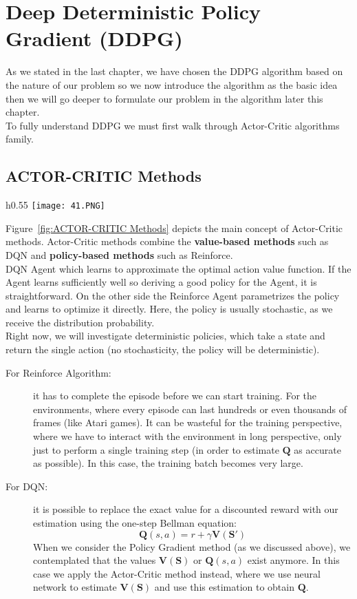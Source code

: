 \chapter{Deep Deterministic Policy Gradient (DDPG)}
As we stated in the last chapter, we have chosen the DDPG algorithm based on the nature of our problem so we now introduce the algorithm as the basic idea then we will go deeper to formulate our problem in the algorithm later this chapter.\\
To fully understand DDPG we must first walk through Actor-Critic algorithms family.

\section{ACTOR-CRITIC Methods}
\begin{wrapfigure}{h}{0.55\textwidth}
    \centering
    \texttt{[image: 41.PNG]}
    \caption{ACTOR-CRITIC Methods}
    \label{fig:ACTOR-CRITIC Methods}
\end{wrapfigure}

Figure~\ref{fig:ACTOR-CRITIC Methods} depicts the main concept of Actor-Critic methods. Actor-Critic methods combine the \textbf{value-based methods} such as DQN and \textbf{policy-based methods} such as Reinforce.\\
DQN Agent which learns to approximate the optimal action value function. If the Agent learns sufficiently well so deriving a good policy for the Agent, it is straightforward.
On the other side the Reinforce Agent parametrizes the policy and learns to optimize it directly. Here, the policy is usually stochastic, as we receive the distribution probability.\\
Right now, we will investigate deterministic policies, which take a state and return the single action (no stochasticity, the policy will be deterministic).\\
\begin{description}
    \item[For Reinforce Algorithm:] it has to complete the episode before we can start training. For the environments, where every episode can last hundreds or even thousands of frames (like Atari games). It can be wasteful for the training perspective, where we have to interact with the environment in long perspective, only just to perform a single training step (in order to estimate $\mathbf{Q}$ as accurate as possible). In this case, the training batch becomes very large.
    \item[For DQN:] it is possible to replace the exact value for a discounted reward with our estimation using the one-step Bellman equation:
    \[ \mathbf{Q}(s,a) = r + \gamma \mathbf{V}( \mathbf{S}' ) \]
    When we consider the Policy Gradient method (as we discussed above), we contemplated that the values $\mathbf{V}(\mathbf{S})$ or $\mathbf{Q}\left(s,a\right)$ exist anymore. In this case we apply the Actor-Critic method instead, where we use neural network to estimate $\mathbf{V}(\mathbf{S})$ and use this estimation to obtain $\mathbf{Q}$.
\end{description}

